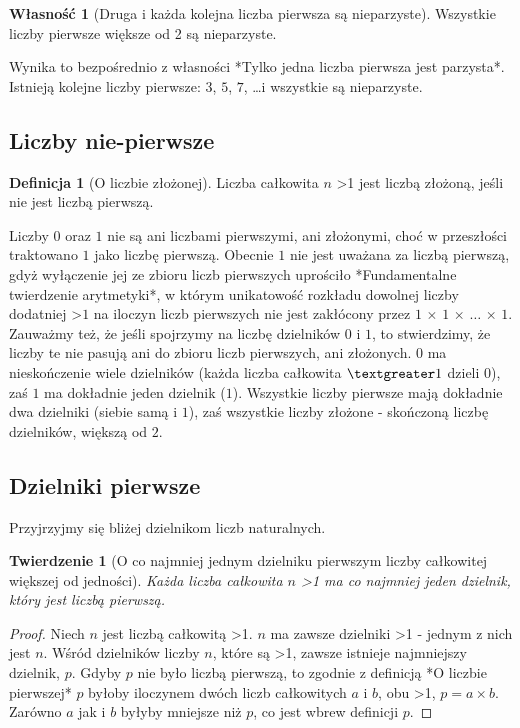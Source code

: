 \documentclass[10pt,onecolumn]{article}
\newtheorem{theorem}{Twierdzenie}
\theoremstyle{definition}
\newtheorem{definition}{Definicja}
\theoremstyle{hypothesis}
\theoremstyle{capability}
\newtheorem{capability}{Własność}
\begin{document}
\begin{capability}[Druga i każda kolejna liczba pierwsza są nieparzyste]
Wszystkie liczby pierwsze większe od 2 są nieparzyste.
\end{capability}

Wynika to bezpośrednio z własności *Tylko jedna liczba pierwsza jest parzysta*. Istnieją kolejne liczby pierwsze: $3$, $5$, $7$, \ldots i wszystkie są nieparzyste.

\subsection{Liczby nie-pierwsze}

\begin{definition} [O liczbie złożonej]
Liczba całkowita $n$ \textgreater 1 jest liczbą złożoną, jeśli nie jest liczbą pierwszą.
\end{definition}

Liczby $0$ oraz $1$ nie są ani liczbami pierwszymi, ani złożonymi, choć w przeszłości traktowano $1$ jako liczbę pierwszą. Obecnie $1$ nie jest uważana za liczbą pierwszą, gdyż wyłączenie jej ze zbioru liczb pierwszych uprościło *Fundamentalne twierdzenie arytmetyki*, w którym unikatowość rozkładu dowolnej liczby dodatniej \textgreater $1$ na iloczyn liczb pierwszych nie jest zakłócony przez $1$ $\times$ $1$ $\times$ $\ldots$ $\times$ $1$. Zauważmy też, że jeśli spojrzymy na liczbę dzielników $0$ i $1$, to stwierdzimy, że liczby te nie pasują ani do zbioru liczb pierwszych, ani złożonych. $0$ ma nieskończenie wiele dzielników (każda liczba całkowita $\textgreater 1$ dzieli $0$), zaś $1$ ma dokładnie jeden dzielnik ($1$). Wszystkie liczby pierwsze mają dokładnie dwa dzielniki (siebie samą i $1$), zaś wszystkie liczby złożone - skończoną liczbę dzielników, większą od $2$.

\subsection{Dzielniki pierwsze}

Przyjrzyjmy się bliżej dzielnikom liczb naturalnych.

\begin{theorem} [O co najmniej jednym dzielniku pierwszym liczby całkowitej większej od jedności]
Każda liczba całkowita $n$ \textgreater 1 ma co najmniej jeden dzielnik, który jest liczbą pierwszą. 
\end{theorem}
 
\begin{proof}
Niech $n$ jest liczbą całkowitą \textgreater 1. $n$ ma zawsze dzielniki \textgreater 1 - jednym z nich jest $n$.  Wśród dzielników liczby $n$, które są \textgreater 1, zawsze istnieje najmniejszy dzielnik, $p$. Gdyby $p$ nie było liczbą pierwszą, to zgodnie z definicją *O liczbie pierwszej* $p$ byłoby iloczynem dwóch liczb całkowitych $a$ i $b$, obu \textgreater 1, $p = a \times b$. Zarówno $a$ jak i $b$ byłyby mniejsze niż $p$, co jest wbrew definicji $p$.
\end{proof}
\end{document}
